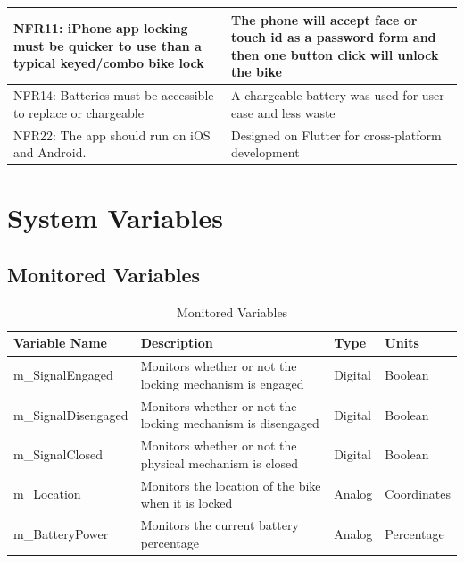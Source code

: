 \documentclass[12pt, titlepage]{article}
\begin{document}
\begin{table}[hp]
\begin{tabular}{| p{} | p{} | }
 \hline
NFR11: iPhone app locking must be quicker to use than a typical keyed/combo bike lock &The phone will accept face or touch id as a password form and then one button click will unlock the bike \\
 \hline
NFR14: Batteries must be accessible to replace or chargeable&A chargeable battery was used for user ease and less waste\\
 \hline
NFR22: The app should run on iOS and Android.&Designed on Flutter for cross-platform development\\
 \hline
\end{tabular}
\end{table}




\newpage
\section{System Variables}


\subsection{Monitored Variables}

\begin{table}[hp]
\caption{\label{Monitored Variables} Monitored Variables}
\begin{tabular}{| p{} | p{} | p{} | p{} |}
 \hline
 Variable Name & Description & Type & Units \\ 
 \hline
 m\_SignalEngaged & Monitors whether or not the locking mechanism is engaged & Digital & Boolean \\ 
  \hline
 m\_SignalDisengaged & Monitors whether or not the locking mechanism is disengaged & Digital & Boolean \\ 
  \hline
 m\_SignalClosed& Monitors whether or not the physical mechanism is closed & Digital & Boolean \\ 
  \hline
 m\_Location & Monitors the location of the bike when it is locked & Analog & Coordinates \\ 
  \hline
 m\_BatteryPower & Monitors the current battery percentage & Analog & Percentage \\ 
 \hline
\end{tabular}
\end{table}
\end{document}
